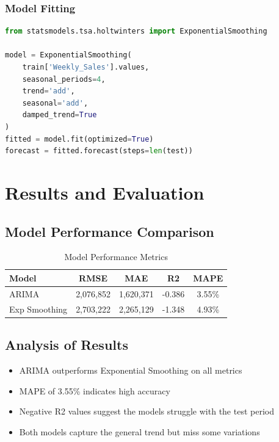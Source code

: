 \documentclass[12pt,a4paper]{report}
\begin{document}
\subsection{Model Fitting}
\begin{lstlisting}[language=Python]
from statsmodels.tsa.holtwinters import ExponentialSmoothing

model = ExponentialSmoothing(
    train['Weekly_Sales'].values,
    seasonal_periods=4,
    trend='add',
    seasonal='add',
    damped_trend=True
)
fitted = model.fit(optimized=True)
forecast = fitted.forecast(steps=len(test))
\end{lstlisting}

\chapter{Results and Evaluation}
\label{ch:results}

\section{Model Performance Comparison}

\begin{table}[H]
\centering
\caption{Model Performance Metrics}
\begin{tabular}{lcccc}
\toprule
\textbf{Model} & \textbf{RMSE} & \textbf{MAE} & \textbf{R2} & \textbf{MAPE} \\
\midrule
ARIMA & 2,076,852 & 1,620,371 & -0.386 & 3.55\% \\
Exp Smoothing & 2,703,222 & 2,265,129 & -1.348 & 4.93\% \\
\bottomrule
\end{tabular}
\end{table}

\section{Analysis of Results}
\begin{itemize}
    \item ARIMA outperforms Exponential Smoothing on all metrics
    \item MAPE of 3.55\% indicates high accuracy
    \item Negative R2 values suggest the models struggle with the test period
    \item Both models capture the general trend but miss some variations
\end{itemize}
\end{document}
